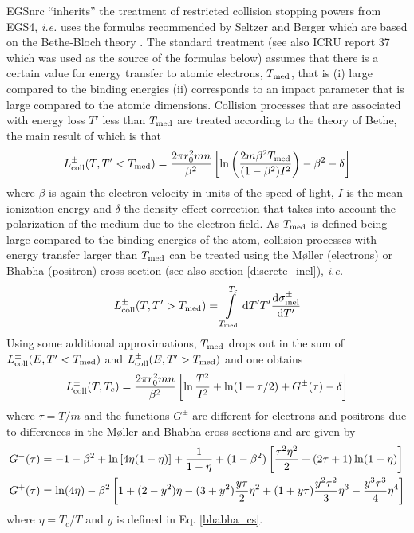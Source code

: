 EGSnrc ``inherits'' the treatment of restricted collision
stopping powers from EGS4, {\em i.e.} uses the formulas
recommended by Seltzer and Berger \cite{BS64} which are based
on the Bethe-Bloch theory \cite{Be30,Be32,Bl33}. The standard
treatment (see also ICRU report 37 \cite{ICRU37} which was
used as the source of the formulas below)
assumes that there is a certain value for energy
transfer to atomic electrons, $T_{\rm med}$, that is (i)
large compared to the binding energies (ii) corresponds to
an impact parameter that is large compared to the atomic
dimensions. Collision processes that are associated with
energy loss $T'$ less than $T_{\rm med}$ are treated according to
the theory of Bethe, the main result of which is that
\begin{equation}
L_{\rm coll}^\pm(T,T' < T_{\rm med}) = {2 \pi r_0^2 m n \over \beta^2}
\left[ \ln \left(2 m \beta^2 T_{\rm med} \over (1 - \beta^2) I^2 \right)
- \beta^2 - \delta \right]
\end{equation}
where $\beta$ is again the electron velocity in units of
the speed of light, $I$ is the mean ionization energy and
$\delta$ the density effect correction that takes into
account the polarization of the medium due to the electron field.
As $T_{\rm med}$ is defined being large compared to the binding energies of
the atom, collision processes with energy transfer larger
than $T_{\rm med}$ can be treated using the M{\o}ller \cite{Mo32a} (electrons)
or Bhabha \cite{Bh35} (positron) cross section (see also section
\ref{discrete_inel}), {\em i.e.}
 
\begin{equation}
L_{\rm coll}^\pm(T,T' > T_{\rm med}) = \int\limits_{T_{\rm med}}^{T_c}
{\rm d}T' T' {{\rm d} \sigma_{\rm inel}^\pm \over {\rm d}T'}
\end{equation}
Using some additional approximations, $T_{\rm med}$ drops out
in the sum of $L_{\rm coll}^\pm(E,T' < T_{\rm med})$ and
$L_{\rm coll}^\pm(E,T' > T_{\rm med})$ and one obtains
\begin{equation}
L_{\rm coll}^\pm(T,T_c) = {2 \pi r_0^2 m n \over \beta^2}
\left[ \ln {T^2 \over I^2} + \ln(1 + \tau/2) + G^\pm(\tau) - \delta \right]
\end{equation}
where $\tau = T/m$ and the functions $G^\pm$ are different for
electrons and positrons due to differences in the M{\o}ller and
Bhabha cross sections and are given by
\begin{equation}
\begin{split}
G^-(\tau) & = -1 - \beta^2  + \ln\left[4 \eta (1 - \eta) \right] +
{1 \over 1 - \eta} + (1 - \beta^2) \left[ {\tau^2 \eta^2 \over 2} +
(2 \tau + 1) \ln(1 - \eta) \right] \\
G^+(\tau) & = \ln(4 \eta) - \beta^2 \left[ 1 + (2 - y^2) \eta -
(3 + y^2) {y \tau \over 2} \eta^2 + (1 + y \tau) {y^2 \tau^2 \over 3} \eta^3
- {y^3 \tau^3 \over 4} \eta^4
\right]
\end{split}
\end{equation}
where $\eta = T_c/T$ and $y$ is defined in Eq. \eqref{bhabha_cs}.

